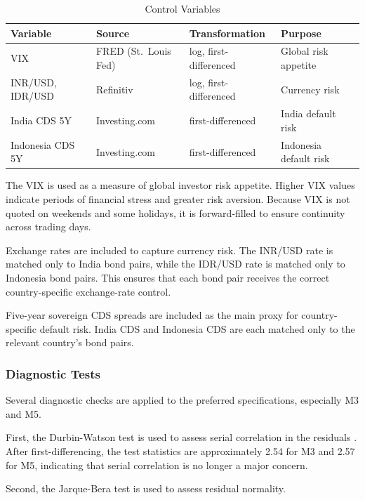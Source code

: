 \documentclass[12pt,a4paper]{article}
\begin{document}
\begin{table}[H]
\centering
\caption{Control Variables}
\label{tab:controls}
\small
\begin{tabular}{llll}
\toprule
\textbf{Variable} & \textbf{Source} & \textbf{Transformation} & \textbf{Purpose} \\
\midrule
VIX              & FRED (St.\ Louis Fed) & log, first-differenced & Global risk appetite \\
INR/USD, IDR/USD & Refinitiv              & log, first-differenced & Currency risk \\
India CDS 5Y     & Investing.com          & first-differenced      & India default risk \\
Indonesia CDS 5Y & Investing.com          & first-differenced      & Indonesia default risk \\
\bottomrule
\end{tabular}
\end{table}

The VIX is used as a measure of global investor risk appetite. Higher VIX values indicate periods of financial stress and greater risk aversion. Because VIX is not quoted on weekends and some holidays, it is forward-filled to ensure continuity across trading days.

Exchange rates are included to capture currency risk. The INR/USD rate is matched only to India bond pairs, while the IDR/USD rate is matched only to Indonesia bond pairs. This ensures that each bond pair receives the correct country-specific exchange-rate control.

Five-year sovereign CDS spreads are included as the main proxy for country-specific default risk. India CDS and Indonesia CDS are each matched only to the relevant country’s bond pairs.

\subsubsection{Diagnostic Tests}

Several diagnostic checks are applied to the preferred specifications, especially M3 and M5.

First, the Durbin-Watson test is used to assess serial correlation in the residuals \citep{Durbin1950}. After first-differencing, the test statistics are approximately 2.54 for M3 and 2.57 for M5, indicating that serial correlation is no longer a major concern.

Second, the Jarque-Bera test is used to assess residual normality.
\end{document}
